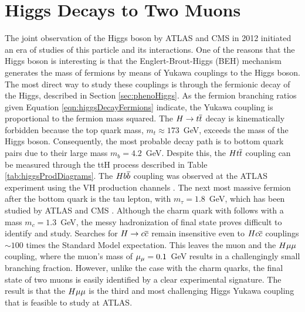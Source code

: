 \chapter{Higgs Decays to Two Muons}\label{sec:hmumu}


The joint observation of the Higgs boson by ATLAS \cite{atlashiggs} and CMS \cite{cmshiggs} in 2012 initiated an era of studies of this particle and its interactions.
One of the reasons that the Higgs boson is interesting is that the Englert-Brout-Higgs (BEH) mechanism generates the mass of fermions by means of Yukawa couplings to the Higgs boson.
The most direct way to study these couplings is through the fermionic decay of the Higgs, described in Section \ref{sec:phenoHiggs}.
As the fermion branching ratios given Equation \ref{eqn:higgsDecayFermions} indicate, the Yukawa coupling is proportional to the fermion mass squared.
The $H\to t\overline{t}$ decay is kinematically forbidden because the top quark mass, $m_t\approx173$~GeV, exceeds the mass of the Higgs boson.
Consequently, the most probable decay path is to bottom quark pairs due to their large mass $m_b=4.2$~GeV. 
Despite this, the $Ht\overline{t}$ coupling can be measured through the ttH process described in Table \ref{tab:higgsProdDiagrams}.
The $Hb\overline{b}$ coupling was observed at the ATLAS experiment using the VH production channels \cite{atlasHbb}.
The next most massive fermion after the bottom quark is the tau lepton, with $m_\tau=1.8$~GeV, which has been studied by ATLAS \cite{atlasTauTau} and CMS \cite{cmsTauTau}.
Although the charm quark with follows with a mass $m_c=1.3$~GeV, the messy hadronization of final state proves difficult to identify and study.
Searches for $H\to c\overline{c}$ remain insensitive even to $Hc\overline{c}$ couplings $\sim100$ times the Standard Model expectation.
This leaves the muon and the $H\mu\mu$ coupling, where the muon's mass of $\mu_\mu=0.1$~GeV results in a challengingly small branching fraction.
However, unlike the case with the charm quarks, the final state of two muons is easily identified by a clear experimental signature.
The result is that the $H\mu\mu$ is the third and most challenging Higgs Yukawa coupling that is feasible to study at ATLAS.


